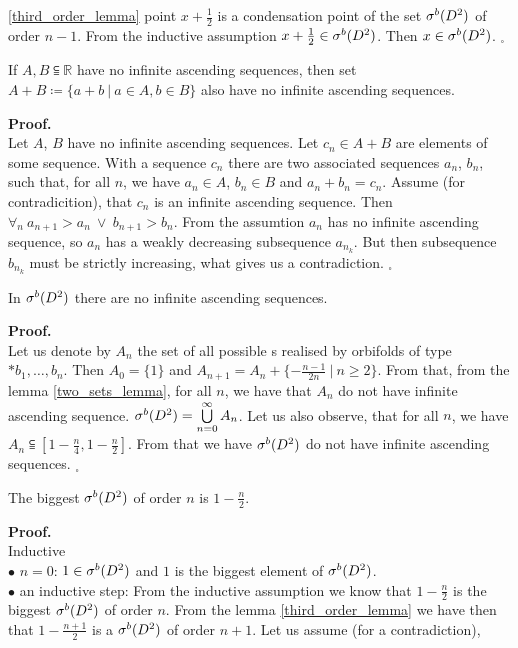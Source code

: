 \ref{third_order_lemma} point $x+\frac{1}{2}$ is a condensation point of the set ${\mathcal{\sigma}^b(D^2)}$  
of order $n-1$. From the inductive assumption $x+\frac{1}{2} \in {\mathcal{\sigma}^b(D^2)}$. Then $x \in {\mathcal{\sigma}^b(D^2)}$. 
$_\square$ 
\begin{lemma}\label{two_sets_lemma}
If $A, B \subseteqq \mathbb{R}$ have no infinite ascending sequences, then set 
$A + B \coloneqq \{a+b\ |\ a \in A, b \in B\}$ also have no infinite ascending sequences. 
\end{lemma}
\noindent\textbf{Proof.} \\
Let $A$, $B$ have no infinite ascending sequences. 
Let $c_n \in A + B$ are elements of some sequence. With a sequence $c_n$ there are 
two associated sequences $a_n$, $b_n$, such that, for all $n$, we have $a_n \in A$, $b_n \in B$ and 
$a_n + b_n = c_n$. Assume (for contradicition), that $c_n$ is an infinite ascending sequence. 
Then $\forall_n\ a_{n+1}>a_n\ \lor\ b_{n+1} > b_n$. From the assumtion $a_n$ has no infinite 
ascending sequence, so $a_n$ has a weakly decreasing subsequence $a_{n_k}$. But then 
subsequence $b_{n_k}$ must be strictly increasing, what gives 
us a contradiction. \Lightning $_\square$ 
\begin{lemma}\label{well_order}
In ${\mathcal{\sigma}^b(D^2)}$ there are no infinite ascending sequences.
\end{lemma}
\noindent\textbf{Proof.} \\
Let us denote by $A_n$ the set of all possible \Eoc s realised by orbifolds of type 
$*b_1,\dots,b_n$. Then $A_0 = \{1\}$ and $A_{n+1}=A_n+\{-\frac{n-1}{2n}\ |\ n\geq 2\}$. 
From that, from the lemma \ref{two_sets_lemma}, for all $n$, we have that $A_n$ do not have 
infinite ascending sequence. ${\mathcal{\sigma}^b(D^2)} = \bigcup\limits^\infty_{n=0}A_n$. Let us also observe, that 
for all $n$, we have $A_n \subseteqq [1-\frac{n}{4},1-\frac{n}{2}]$. From that we have ${\mathcal{\sigma}^b(D^2)}$ 
do not have infinite ascending sequences. $_\square$
\begin{theorem}\label{biggest \cpots}
The biggest \cpots ${\mathcal{\sigma}^b(D^2)}$ of order $n$ is $1-\frac{n}{2}$.
\end{theorem}
\noindent\textbf{Proof.}\\
Inductive \\
$\bullet$ $n=0$: $1\in {\mathcal{\sigma}^b(D^2)}$ and $1$ is the biggest element of ${\mathcal{\sigma}^b(D^2)}$. \\
$\bullet$ an inductive step: From the inductive assumption we know that $1-\frac{n}{2}$ is 
the biggest \cpots  ${\mathcal{\sigma}^b(D^2)}$ of order $n$. From the lemma \ref{third_order_lemma} we have then 
that $1-\frac{n+1}{2}$ is a \cpots  ${\mathcal{\sigma}^b(D^2)}$ of order $n+1$. Let us assume (for a contradiction), 
